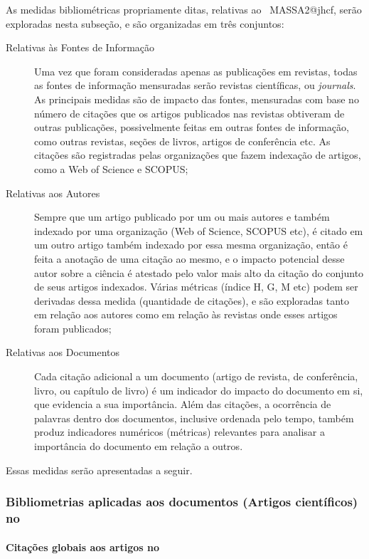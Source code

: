 As medidas bibliométricas propriamente ditas, relativas ao \dataset\ MASSA2@jhcf, serão exploradas nesta subseção, e são organizadas em três conjuntos:
\begin{description}
    \item [Relativas às Fontes de Informação] Uma vez que foram consideradas apenas as publicações em revistas, todas as fontes de informação mensuradas serão revistas científicas, ou \textit{journals}. As principais medidas são de impacto das fontes, mensuradas com base no número de citações que os artigos publicados nas revistas obtiveram de outras publicações, possivelmente feitas em outras fontes de informação, como outras revistas, seções de livros, artigos de conferência etc. As citações são registradas pelas organizações que fazem indexação de artigos, como a Web of Science e SCOPUS;
    \item [Relativas aos Autores] Sempre que um artigo publicado por um ou mais autores e também indexado por uma organização (Web of Science,  SCOPUS etc), é citado em um outro artigo também indexado por essa mesma organização, então é feita a anotação de uma citação ao mesmo, e o impacto potencial desse autor sobre a ciência é atestado pelo valor mais alto da citação do conjunto de seus artigos indexados. Várias métricas (índice H, G, M etc) podem ser derivadas dessa medida (quantidade de citações), e são exploradas tanto em relação aos autores como em relação às revistas onde esses artigos foram publicados;
    \item [Relativas aos Documentos] Cada citação adicional a  um documento (artigo de revista, de conferência, livro, ou  capítulo de livro) é um indicador do impacto do documento em si, que evidencia a sua importância. Além das citações, a ocorrência de palavras dentro dos documentos, inclusive ordenada pelo tempo, também produz indicadores numéricos (métricas) relevantes para analisar a importância do documento em relação a outros. 
\end{description}

Essas medidas serão apresentadas a seguir.

\subsubsection{Bibliometrias aplicadas aos documentos (Artigos científicos) no \dataset}

\paragraph{Citações globais aos artigos no \dataset}

